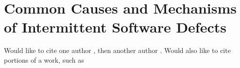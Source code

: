 \section{Common Causes and Mechanisms of Intermittent Software Defects}
\label{scmd0}

Would like to cite one author \cite{lamport94}, then another author \cite{lamport95}.
Would also like to cite portions of a work, such as \cite[p. 314]{lamport95}
